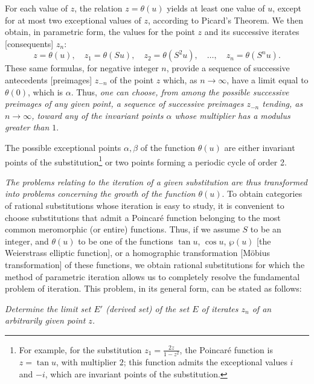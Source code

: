 \documentclass[12pt, a4paper]{article}
\begin{document}
\newpage

For each value of $z$, the relation $z = \theta(u)$ yields at least one value of
$u$, except for at most two exceptional values of $z$, according to Picard's
Theorem. We then obtain, in parametric form, the values for the point $z$ and
its successive iterates [consequents] $z_n$:
\begin{equation*}
    z   = \theta(u), \quad z_1 = \theta(Su), \quad z_2 = \theta(S^2 u), \quad \ldots, \quad z_n = \theta(S^n u).
\end{equation*}
These same formulas, for negative integer $n$, provide a sequence of successive
antecedents [preimages] $z_{-n}$ of the point $z$ which, as $n \to \infty$, have
a limit equal to $\theta(0)$, which is $\alpha$. Thus, \emph{one can choose, from
among the possible successive preimages of any given point, a sequence of
successive preimages $z_{-n}$ tending, as $n \to \infty$, toward any of the
invariant points $\alpha$ whose multiplier has a modulus greater than $1$}.

The possible exceptional points $\alpha, \beta$ of the function $\theta(u)$ are
either invariant points of the substitution\footnote{For example, for the
substitution $z_1 = \frac{2z}{1-z^2}$, the Poincaré function is $z = \tan u$,
with multiplier $2$; this function admits the exceptional values $i$ and $-i$,
which are invariant points of the substitution.} or two points forming a
periodic cycle of order 2.

\emph{The problems relating to the iteration of a given substitution are thus
transformed into problems concerning the growth of the function $\theta(u)$}. To
obtain categories of rational substitutions whose iteration is easy to study, it
is convenient to choose substitutions that admit a Poincaré function belonging
to the most common meromorphic (or entire) functions. Thus, if we assume $S$ to
be an integer, and $\theta(u)$ to be one of the functions $\tan u$, $\cos u$,
$\wp(u)$ [the Weierstrass elliptic function], or a homographic transformation
[Möbius transformation] of these functions, we obtain rational substitutions for
which the method of parametric iteration allows us to completely resolve the
fundamental problem of iteration. This problem, in its general form, can be
stated as follows:

\vspace{1em}
\emph{Determine the limit set $E'$ (derived set) of the set $E$ of iterates
$z_n$ of an arbitrarily given point $z$.}
\vspace{1em}
\end{document}
